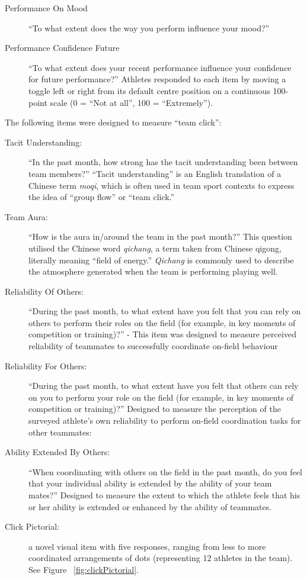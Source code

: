 \begin{CJK}{UTF8}{gbsn}
    \begin{description}
    \item[Performance On Mood] ``To what extent does the way you perform influence your mood?''
    \item [Performance Confidence Future] ``To what extent does your recent performance influence your confidence for future performance?''
    Athletes responded to each item by moving a toggle left or right from its default centre position on a continuous 100-point scale (0 = ``Not at all'', 100 = ``Extremely'').
    \end{description}


The following items were designed to measure ``team click'':
\begin{description}
  \item [Tacit Understanding:] ``In the past month, how strong has the tacit understanding been between team members?''  ``Tacit understanding'' is an English translation of a Chinese term \textit{moqi}, which is often used in team sport contexts to express the idea of  ``group flow'' or ``team click.''
  \item [Team Aura:] ``How is the aura in/around the team in the past month?'' This question utilised the Chinese word \textit{qichang}, a term taken from Chinese qigong, literally meaning ``field of energy.'' \textit{Qichang} is commonly used to describe the atmosphere generated when the team is performing playing well.
  \item [Reliability Of Others:] ``During the past month, to what extent have you felt that you can rely on others to perform their roles on the field (for example, in key moments of competition or training)?'' - This item was designed to measure perceived reliability of teammates to successfully coordinate  on-field behaviour
  \item [Reliability For Others:] ``During the past month, to what extent have you felt that others can rely on you to perform your role on the field (for example, in key moments of competition or training)?'' Designed to measure the perception of the surveyed athlete's own reliability to perform on-field coordination tasks for other teammates:
  \item[Ability Extended By Others:] ``When coordinating with others on the field in the past month, do you feel that your individual ability is extended by the ability of your team mates?'' Designed to measure the extent to which the athlete feels that his or her ability is extended or enhanced by the ability of teammates.
  \item [Click Pictorial:] a novel visual item with five responses, ranging from less to more coordinated arrangements of dots (representing 12 athletes in the team). See Figure ~\ref{fig:clickPictorial}.
\end{description}


\end{CJK}
